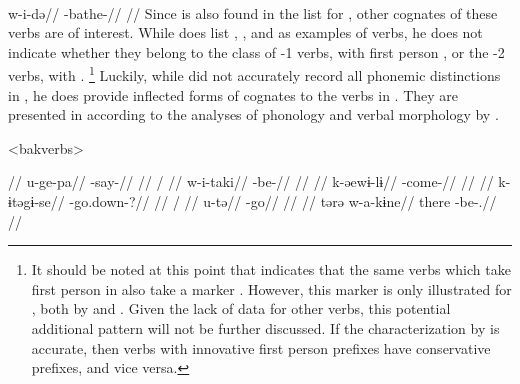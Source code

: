 \bakairi \parencite[][4]{meira2003bakairi}\\
\begingl
\gla w-i-də//
\glb {}-bathe-//
\glft {}//
\endgl
\xe
%
Since  is also found in the list for \arara, other \bakairi cognates of these verbs are of interest.
While \textcite[4]{meira2003bakairi} does list  ,  , and   as examples of  verbs, he does not indicate whether they belong to the class of -1 verbs, with first person , or the -2 verbs, with .%
\footnote{
It should be noted at this point that \textcite{meira2003bakairi} indicates that the same verbs which take first person  in \bakairi also take a  marker .
However, this marker is only illustrated for , both by \textcite{meira2003bakairi} and \textcite{von1892bakairi}.
Given the lack of data for other verbs, this potential additional pattern will not be further discussed.
If the characterization by \citeauthor{meira2003bakairi} is accurate, then verbs with innovative first person prefixes have conservative  prefixes, and vice versa.
}
Luckily, while \textcite{von1892bakairi} did not accurately record all phonemic distinctions in \bakairi \parencite{meira2005bakairi}, he does provide inflected forms of cognates to the \arara verbs in .
They are presented in  according to the analyses of \bakairi phonology and verbal morphology by \textcites{wheatley1969bakairi}{meira2003bakairi}{meira2005bakairi}{franchetto2016classes}.

\pex[everyglpreamble=]<bakverbs> \bakairi \parencite[][131, 397, 76, 137, 374, 130]{von1892bakairi}
\begin{multicols}{2}
\begingl
\glpreamble {} //
\gla u-ge-pa//
\glb {}-say-//
\glft {}//
\endgl
{}
\begingl
\glpreamble {} /  //
\gla w-i-taki//
\glb {}-be-//
\glft {}//
\endgl
{}
\begingl
\glpreamble {} //
\gla k-əewɨ-lɨ//
\glb {}-come-//
\glft {}//
\endgl
{}
\begingl
\glpreamble {} //
\gla k-ɨtəgɨ-se//
\glb {}-go.down-?//
\glft {}//
\endgl
{}
\begingl
\glpreamble {} / //
\gla u-tə//
\glb {}-go//
\glft {}//
\endgl
{}
\begingl
\glpreamble {}//
\gla tərə w-a-kɨne//
\glb there -be-.//
\glft {}//
\endgl
\end{multicols}
\xe

